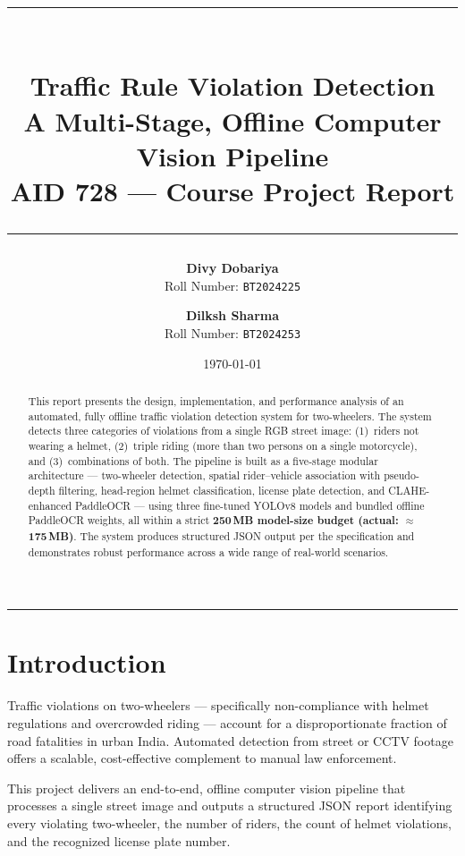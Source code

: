 \documentclass[12pt,a4paper]{article}
\title{
  \vspace{-1cm}
  {\color{primaryblue}\rule{\linewidth}{2pt}}\\[0.5em]
  \textbf{\LARGE Traffic Rule Violation Detection} \\[0.4em]
  \large\color{gray} A Multi-Stage, Offline Computer Vision Pipeline \\[0.3em]
  \normalsize AID 728 — Course Project Report \\[0.3em]
  {\color{primaryblue}\rule{\linewidth}{0.5pt}}
}
\author{
  \textbf{Divy Dobariya} \\ Roll Number: \texttt{BT2024225}
  \and
  \textbf{Dilksh Sharma} \\ Roll Number: \texttt{BT2024253}
}
\date{\today}
\begin{document}
\maketitle
\thispagestyle{firstpage}

\begin{abstract}
\noindent
This report presents the design, implementation, and performance analysis of an automated,
fully offline traffic violation detection system for two-wheelers. The system detects three
categories of violations from a single RGB street image: (1)~riders not wearing a helmet,
(2)~triple riding (more than two persons on a single motorcycle), and (3)~combinations of
both. The pipeline is built as a five-stage modular architecture — two-wheeler detection,
spatial rider–vehicle association with pseudo-depth filtering, head-region helmet
classification, license plate detection, and CLAHE-enhanced PaddleOCR — using three
fine-tuned YOLOv8 models and bundled offline PaddleOCR weights, all within a strict
\textbf{250\,MB model-size budget (actual: $\approx$175\,MB)}. The system produces
structured JSON output per the specification and demonstrates robust performance across
a wide range of real-world scenarios.
\end{abstract}

\vspace{0.5em}
\hrule
\vspace{1em}

\section{Introduction}

Traffic violations on two-wheelers — specifically non-compliance with helmet regulations and
overcrowded riding — account for a disproportionate fraction of road fatalities in urban
India. Automated detection from street or CCTV footage offers a scalable, cost-effective
complement to manual law enforcement.

This project delivers an end-to-end, offline computer vision pipeline that processes a
single street image and outputs a structured JSON report identifying every violating
two-wheeler, the number of riders, the count of helmet violations, and the recognized
license plate number.
\end{document}
